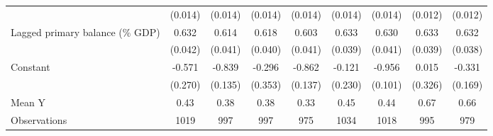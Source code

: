 {\begin{tabular}{l*{8}{c}}
                    &     (0.014)         &     (0.014)         &     (0.014)         &     (0.014)         &     (0.014)         &     (0.014)         &     (0.012)         &     (0.012)         \\
\addlinespace
Lagged primary balance (\% GDP)&       0.632\sym{***}&       0.614\sym{***}&       0.618\sym{***}&       0.603\sym{***}&       0.633\sym{***}&       0.630\sym{***}&       0.633\sym{***}&       0.632\sym{***}\\
                    &     (0.042)         &     (0.041)         &     (0.040)         &     (0.041)         &     (0.039)         &     (0.041)         &     (0.039)         &     (0.038)         \\
\addlinespace
Constant            &      -0.571\sym{**} &      -0.839\sym{***}&      -0.296         &      -0.862\sym{***}&      -0.121         &      -0.956\sym{***}&       0.015         &      -0.331\sym{*}  \\
                    &     (0.270)         &     (0.135)         &     (0.353)         &     (0.137)         &     (0.230)         &     (0.101)         &     (0.326)         &     (0.169)         \\
\midrule
Mean Y              &        0.43         &        0.38         &        0.38         &        0.33         &        0.45         &        0.44         &        0.67         &        0.66         \\
Observations        &        1019         &         997         &         997         &         975         &        1034         &        1018         &         995         &         979         \\
\bottomrule
\end{tabular}
}

